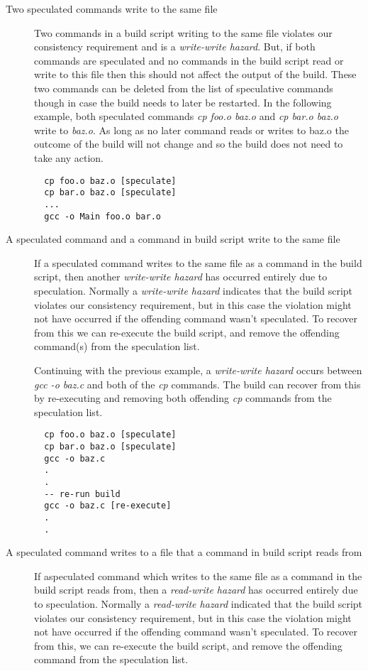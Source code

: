 \begin{description}
\item [Two speculated commands write to the same file]
  Two commands in a build script writing to the same file violates our consistency requirement and is a \emph{write-write hazard}.  But, if both commands are speculated and no commands in the build script read or write to this file then this should not affect the output of the build.  These two commands can be deleted from the list of speculative commands though in case the build needs to later be restarted.  In the following example, both speculated commands \emph{cp foo.o baz.o} and \emph{cp bar.o baz.o} write to \emph{baz.o}.  As long as no later command reads or writes to baz.o the outcome of the build will not change and so the build does not need to take any action.
\begin{verbatim}
  cp foo.o baz.o [speculate]
  cp bar.o baz.o [speculate]
  ...
  gcc -o Main foo.o bar.o
\end{verbatim}

\item [A speculated command and a command in build script write to the same file]
  If a speculated command writes to the same file as a command in the build script, then another \emph{write-write hazard} has occurred entirely due to speculation.  Normally a \emph{write-write hazard} indicates that the build script violates our consistency requirement, but in this case the violation might not have occurred if the offending command wasn't speculated.  To recover from this we can re-execute the build script, and remove the offending command(s) from the speculation list.

  Continuing with the previous example, a \emph{write-write hazard} occurs between \emph{gcc -o baz.c} and both of the \emph{cp} commands.  The build can recover from this by re-executing and removing both offending \emph{cp} commands from the speculation list.

\begin{verbatim}
  cp foo.o baz.o [speculate]
  cp bar.o baz.o [speculate]
  gcc -o baz.c
  .
  .
  -- re-run build
  gcc -o baz.c [re-execute]
  .
  .
\end{verbatim}

\item [A speculated command writes to a file that a command in build script reads from]
  If aspeculated command which writes to the same file as a command in the build script reads from, then a \emph{read-write hazard} has occurred entirely due to speculation.  Normally a \emph{read-write hazard} indicated that the build script violates our consistency requirement, but in this case the violation might not have occurred if the offending command wasn't speculated.  To recover from this, we can re-execute the build script, and remove the offending command from the speculation list.


\end{description}
